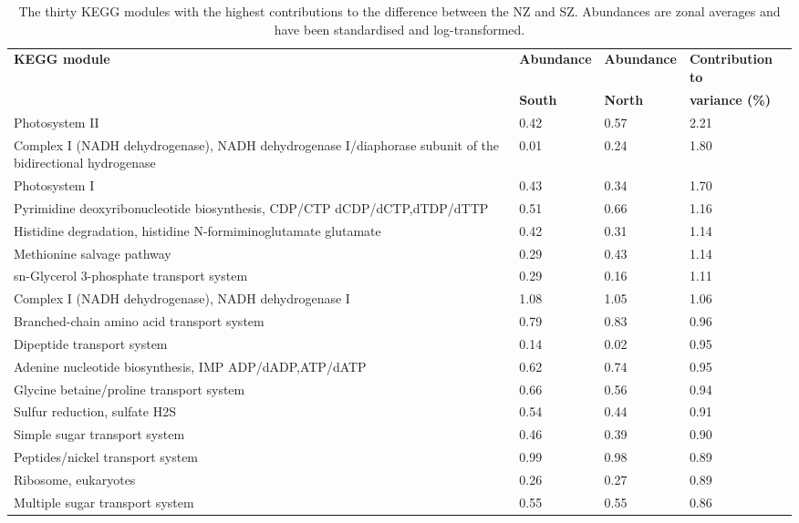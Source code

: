 \begin{landscape}
\begin{table}
\sffamily
\begin{center}
\caption[Contributions of KEGG modules to variance between the North and South zones]{\sffamily{}The thirty \ac{KEGG} modules with the highest contributions to the difference between the \ac{NZ} and \ac{SZ}.
Abundances are zonal averages and have been standardised and log-transformed.
}
\label{tab:modulessimper}
\begin{tabularx}{\linewidth}{Xlll}
\toprule
\textbf{\ac{KEGG} module} & \textbf{Abundance} & \textbf{Abundance} & \textbf{Contribution to}\\
& \textbf{South} & \textbf{North} & \textbf{variance (\%)}\\
\midrule
Photosystem II & 0.42 & 0.57 & 2.21\\
Complex I (NADH dehydrogenase), NADH dehydrogenase I/diaphorase subunit of the bidirectional hydrogenase & 0.01 & 0.24 & 1.80\\
Photosystem I & 0.43 & 0.34 & 1.70\\
Pyrimidine deoxyribonucleotide biosynthesis, CDP/CTP \textrightarrow{} dCDP/dCTP,dTDP/dTTP & 0.51 & 0.66 & 1.16\\
Histidine degradation, histidine \textrightarrow{} N-formiminoglutamate \textrightarrow{} glutamate & 0.42 & 0.31 & 1.14\\
Methionine salvage pathway & 0.29 & 0.43 & 1.14\\
sn-Glycerol 3-phosphate transport system & 0.29 & 0.16 & 1.11\\
Complex I (NADH dehydrogenase), NADH dehydrogenase I & 1.08 & 1.05 & 1.06\\
Branched-chain amino acid transport system & 0.79 & 0.83 & 0.96\\
Dipeptide transport system & 0.14 & 0.02 & 0.95\\
Adenine nucleotide biosynthesis, IMP \textrightarrow{} ADP/dADP,ATP/dATP & 0.62 & 0.74 & 0.95\\
Glycine betaine/proline transport system & 0.66 & 0.56 & 0.94\\
Sulfur reduction, sulfate \textrightarrow{} H2S & 0.54 & 0.44 & 0.91\\
Simple sugar transport system & 0.46 & 0.39 & 0.90\\
Peptides/nickel transport system & 0.99 & 0.98 & 0.89\\
Ribosome, eukaryotes & 0.26 & 0.27 & 0.89\\
Multiple sugar transport system & 0.55 & 0.55 & 0.86\\

\end{tabularx}
\end{center}
\end{table}
\end{landscape}
